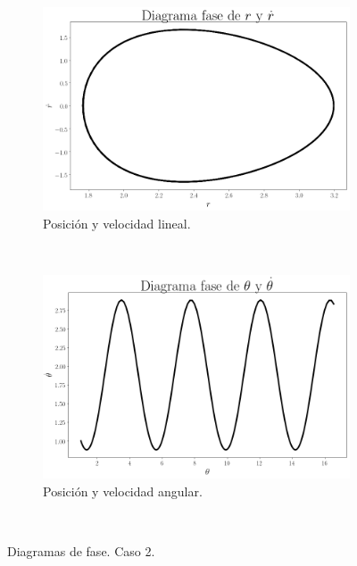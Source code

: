 \documentclass[12pt,letterpaper]{article}
\begin{document}
\begin{figure}
    \centering
    \begin{subfigure}[b]{0.8\textwidth}
        \includegraphics[width=\textwidth]{case04_phase_r_d_r}
        \caption{Posición y velocidad lineal.}
        \label{fig:case 4 phase r lagrange}
    \end{subfigure}
    ~ %
    \begin{subfigure}[b]{0.8\textwidth}
        \includegraphics[width=\textwidth]{case04_phase_theta_d_theta}
        \caption{Posición y velocidad angular.}
        \label{fig:case 4 phase theta lagrange}
    \end{subfigure}
    ~ %
    \caption{Diagramas de fase. Caso 2.}\label{fig:case 4 phase plot lagrange}
\end{figure}
\end{document}
